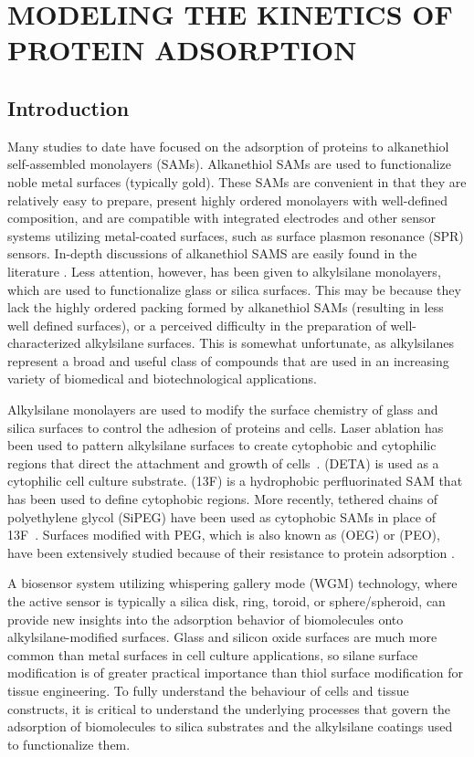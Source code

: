 
\chapter{MODELING THE KINETICS OF PROTEIN ADSORPTION}


\section{Introduction}

Many studies to date have focused on the adsorption of proteins to
alkanethiol self-assembled monolayers (SAMs). Alkanethiol SAMs are
used to functionalize noble metal surfaces (typically gold). These
SAMs are convenient in that they are relatively easy to prepare, present
highly ordered monolayers with well-defined composition, and are compatible
with integrated electrodes and other sensor systems utilizing metal-coated
surfaces, such as surface plasmon resonance (SPR) sensors. In-depth
discussions of alkanethiol SAMS are easily found in the literature
\cite{Love2005}. Less attention, however, has been given to alkylsilane
monolayers, which are used to functionalize glass or silica surfaces.
This may be because they lack the highly ordered packing formed by
alkanethiol SAMs (resulting in less well defined surfaces), or a perceived
difficulty in the preparation of well-characterized alkylsilane surfaces.
This is somewhat unfortunate, as alkylsilanes represent a broad and
useful class of compounds that are used in an increasing variety of
biomedical and biotechnological applications. 

Alkylsilane monolayers are used to modify the surface chemistry of
glass and silica surfaces to control the adhesion of proteins and
cells. Laser ablation has been used to pattern alkylsilane surfaces
to create cytophobic and cytophilic regions that direct the attachment
and growth of cells~\cite{Stenger1992}. 
(DETA) is used as a cytophilic cell culture substrate. 
(13F) is a hydrophobic perfluorinated SAM that has been used to define
cytophobic regions. More recently, tethered chains of polyethylene
glycol (SiPEG) have been used as cytophobic SAMs in place of 13F~\cite{Wilson2011a}.
Surfaces modified with PEG, which is also known as 
(OEG) or  (PEO), have been extensively
studied because of their resistance to protein adsorption \cite{Gombotz1991}.

A biosensor system utilizing whispering gallery mode (WGM) technology,
where the active sensor is typically a silica disk, ring, toroid,
or sphere/spheroid, can provide new insights into the adsorption behavior
of biomolecules onto alkylsilane-modified surfaces. Glass and silicon
oxide surfaces are much more common than metal surfaces in cell culture
applications, so silane surface modification is of greater practical
importance than thiol surface modification for tissue engineering.
To fully understand the behaviour of cells and tissue constructs,
it is critical to understand the underlying processes that govern
the adsorption of biomolecules to silica substrates and the alkylsilane
coatings used to functionalize them.


